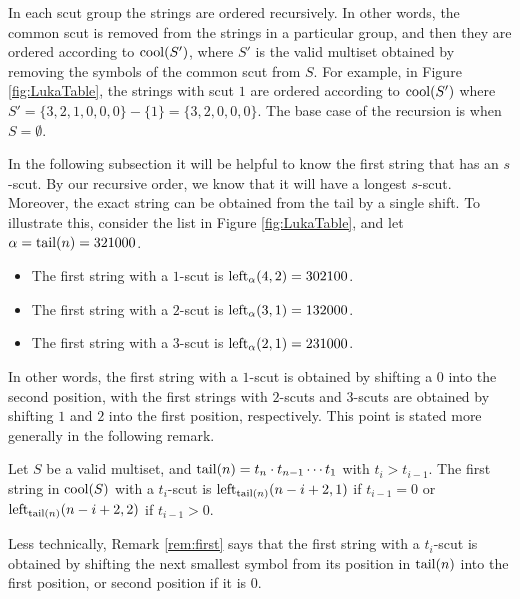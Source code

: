 In each scut group the strings are ordered recursively.
In other words, the common scut is removed from the strings in a particular group, and then they are ordered according to $\cool{S'}$, where $S'$ is the valid multiset obtained by removing the symbols of the common scut from $S$.
For example, in Figure \ref{fig:LukaTable}, the strings with scut $1$ are ordered according to $\cool{S'}$ where $S' = \{3,2,1,0,0,0\} - \{1\} = \{3,2,0,0,0\}$.
The base case of the recursion is when $S = \emptyset$.

In the following subsection it will be helpful to know the first string that has an $s$-scut.
By our recursive order, we know that it will have a longest $s$-scut.
Moreover, the exact string can be obtained from the tail by a single shift.
To illustrate this, consider the list in Figure \ref{fig:LukaTable}, and let $\alpha = \tail(n) = 321000$.
\begin{itemize}
    \item The first string with a $1$-scut is $\lshiftindex[\alpha]{4}{2} = 302100$.
    \item The first string with a $2$-scut is $\lshiftindex[\alpha]{3}{1} = 132000$.
    \item The first string with a $3$-scut is $\lshiftindex[\alpha]{2}{1} = 231000$.
\end{itemize}
In other words, the first string with a $1$-scut is obtained by shifting a $0$ into the second position, with the first strings with $2$-scuts and $3$-scuts are obtained by shifting $1$ and $2$ into the first position, respectively.
This point is stated more generally in the following remark.

\begin{remark}
\label{rem:first}
Let $S$ be a valid multiset, and $\tail(n) = t_n \cdot t_{n-1} \cdots t_1$ with $t_i > t_{i-1}$.
The first string in $\cool{S}$ with a $t_i$-scut is $\lshiftindex[\tail(n)]{n-i+2}{1}$ if $t_{i-1} = 0$ or $\lshiftindex[\tail(n)]{n-i+2}{2}$ if $t_{i-1} > 0$.
\end{remark}

Less technically, Remark \ref{rem:first} says that the first string with a $t_i$-scut is obtained by shifting the next smallest symbol from its position in $\tail(n)$ into the first position, or second position if it is $0$.

